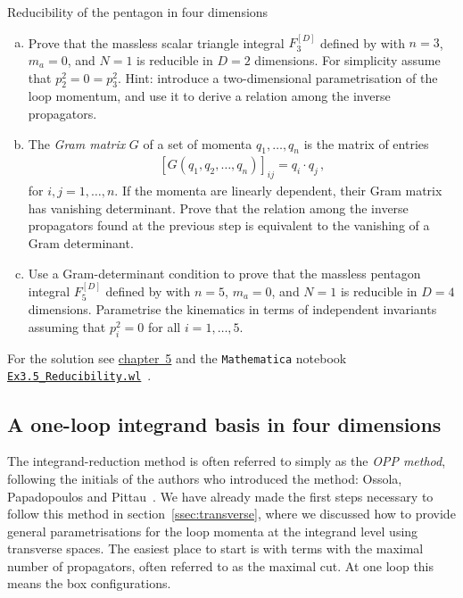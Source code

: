 \begin{exer}{Reducibility of the pentagon in four dimensions}
\label{Ex:3.5}
\vspace{-0.6cm}
\begin{enumerate}[a)]

\item Prove that the massless scalar triangle integral $F_3^{[D]}$ defined by  with $n=3$, $m_a=0$, and $N=1$ is reducible in $D=2$ dimensions. For simplicity assume that $p_2^2=0=p_3^2$. Hint: introduce a two-dimensional parametrisation of the loop momentum, and use it to derive a relation among the inverse propagators.

\smallskip
\item The \emph{Gram matrix} $G$ of a set of momenta $q_1,\ldots,q_n$ is the matrix of entries 
\begin{align} \label{eq:gram_def}
\left[G\left(q_1,q_2,\ldots, q_n\right)\right]_{ij} = q_i \cdot q_j \,,
\end{align}
for $i,j=1,\ldots,n$. If the momenta are linearly dependent, their Gram matrix
has vanishing determinant. Prove that the relation among the inverse
propagators found at the previous step is equivalent to the vanishing of a Gram
determinant.

\smallskip
\item Use a Gram-determinant condition to prove that the massless pentagon integral $F_5^{[D]}$ defined by  with $n=5$, $m_a=0$, and $N=1$ is reducible in $D=4$ dimensions. Parametrise the kinematics in terms of independent invariants assuming that $p_i^2=0$ for all $i=1,\ldots,5$.
\end{enumerate}
For the solution see \hyperref[Sol:3.5]{chapter~5} and the \texttt{Mathematica} notebook \break \href{https://scattering-amplitudes.mpp.mpg.de/scattering-amplitudes-in-qft/Exercises/}{\texttt{Ex3.5\_Reducibility.wl}}~\cite{website-ch3}.
\end{exer}

\subsection{A one-loop integrand basis in four dimensions \label{ssec:4dintegrandbasis}}

The integrand-reduction method is often referred to simply as the \emph{OPP method},
following the initials of the authors who introduced the method: Ossola,
Papadopoulos and Pittau~\cite{ch3_Ossola:2006us}. We have already made the first steps necessary to
follow this method in section~\ref{ssec:transverse}, where we
discussed how to provide general parametrisations for the loop momenta at the
integrand level using transverse spaces. The easiest place to start is with
terms with the maximal number of propagators, often referred to as the maximal
cut. At one loop this means the box configurations.

